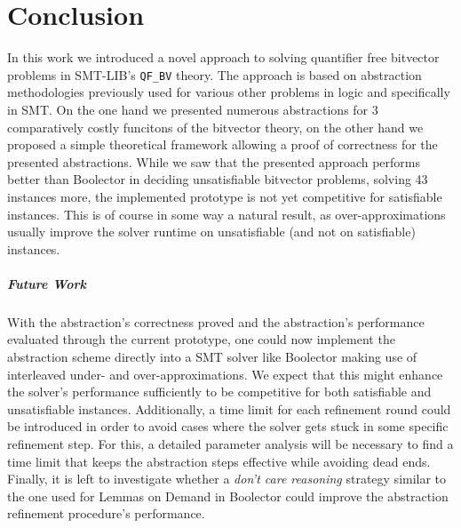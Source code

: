 \chapter{Conclusion}
\label{ch:Conclusion}
In this work we introduced a novel approach to solving quantifier free bitvector problems in SMT-LIB's \texttt{QF\_BV} theory. The approach is based on abstraction methodologies previously used for various other problems in logic and specifically in SMT.
On the one hand we presented numerous abstractions for 3 comparatively costly funcitons of the bitvector theory, on the other hand we proposed a simple theoretical framework allowing a proof of correctness for the presented abstractions.
While we saw that the presented approach performs better than Boolector in deciding unsatisfiable bitvector problems, solving 43 instances more, the implemented prototype is not yet competitive for satisfiable instances. This is of course in some way a natural result, as over-approximations usually improve the solver runtime on unsatisfiable (and not on satisfiable) instances.

\paragraph{Future Work}
With the abstraction's correctness proved and the abstraction's performance evaluated through the current prototype, one could now implement the abstraction scheme directly into a SMT solver like Boolector making use of interleaved under- and over-approximations. We expect that this might enhance the solver's performance sufficiently to be competitive for both satisfiable and unsatisfiable instances.
Additionally, a time limit for each refinement round could be introduced in order to avoid cases where the solver gets stuck in some specific refinement step. For this, a detailed parameter analysis will be necessary to find a time limit that keeps the abstraction steps effective while avoiding dead ends. Finally, it is left to investigate whether a \textit{don't care reasoning} strategy similar to the one used for Lemmas on Demand in Boolector \cite{NiemetzPreinerBiere-FMCAD14} could improve the abstraction refinement procedure's performance.